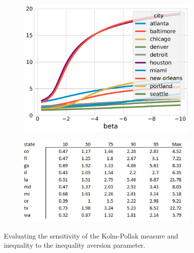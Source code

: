 \documentclass[final,3p,times,onecolumn,sort&compress]{elsarticle}
\begin{document}
\begin{figure}[h!]
    \begin{subfigure}{0.5\textwidth}
        \includegraphics[width=0.9\linewidth]{report/fig/sensitivity_aversion.pdf} 
    \end{subfigure}
    \begin{subfigure}{0.5\textwidth}
        \includegraphics[width=0.9\linewidth]{report/fig/distance_percentile.JPG} 
    \end{subfigure}
    \caption{
    Evaluating the sensitivity of the Kolm-Pollak measure and inequality to the inequality aversion parameter.
    }
    \label{fig:aversion}
\end{figure}
\end{document}
